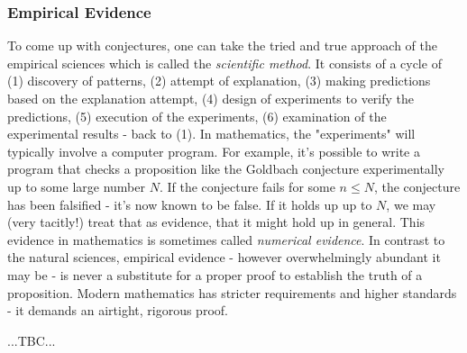 \subsubsection{Empirical Evidence}
To come up with conjectures, one can take the tried and true approach of the empirical sciences which is called the \emph{scientific method}. It consists of a cycle of (1) discovery of patterns, (2) attempt of explanation, (3) making predictions based on the explanation attempt, (4) design of experiments to verify the predictions, (5) execution of the experiments, (6) examination of the experimental results - back to (1). In mathematics, the "experiments" will typically involve a computer program. For example, it's possible to write a program that checks a proposition like the Goldbach conjecture experimentally up to some large number $N$. If the conjecture fails for some $n \leq N$, the conjecture has been falsified - it's now known to be false. If it holds up up to $N$, we may (very tacitly!) treat that as evidence, that it might hold up in general. This evidence in mathematics is sometimes called \emph{numerical evidence}. In contrast to the natural sciences, empirical evidence - however overwhelmingly abundant it may be - is never a substitute for a proper proof to establish the truth of a proposition. Modern mathematics has stricter requirements and higher standards - it demands an airtight, rigorous proof.

...TBC...




